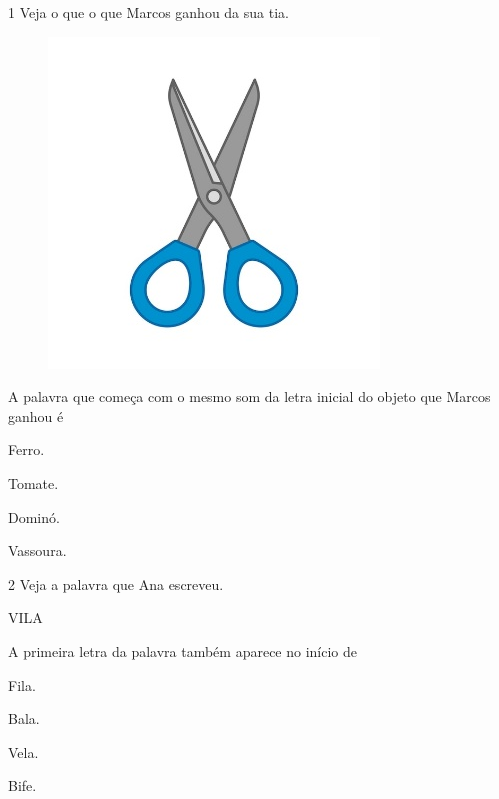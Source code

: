 \num{1} Veja o que o que Marcos ganhou da sua tia.

\begin{figure}[htpb!]
\centering
\includegraphics[width=.5\textwidth]{media/image163.jpeg}
\end{figure}


A palavra que começa com o mesmo som da letra inicial do objeto que
Marcos ganhou é

\begin{escolha}
\item Ferro.

\item Tomate.

\item Dominó.

\item Vassoura.
\end{escolha}

\num{2} Veja a palavra que Ana escreveu.

\begin{myquote}
VILA
\end{myquote}

A primeira letra da palavra também aparece no início de 

\begin{escolha}
\item Fila.

\item Bala.

\item Vela.

\item Bife.
\end{escolha}

